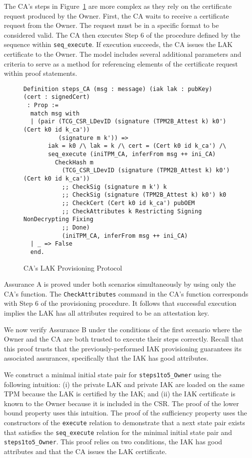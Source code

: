 \documentclass[runningheads]{llncs}
\begin{document}
The CA's steps in Figure~\ref{fig:lak_model_CA} are more complex as
they rely on the certificate request produced by the Owner. 
First, the CA waits to receive a certificate request from the
Owner. The request must be in a specific
format to be considered valid. The CA then executes Step 6 of the
procedure defined by the sequence within \verb|seq_execute|. If
execution succeeds, the CA issues the LAK certificate to the Owner.
The model includes several additional parameters and criteria to serve
as a method for referencing elements of the certificate request
within proof statements.

\begin{figure}[hpbt]
\begin{lstlisting}[language=Coq]
Definition steps_CA (msg : message) (iak lak : pubKey) (cert : signedCert)
 : Prop :=
  match msg with
  | (pair (TCG_CSR_LDevID (signature (TPM2B_Attest k) k0') (Cert k0 id k_ca'))
          (signature m k')) =>
       iak = k0 /\ lak = k /\ cert = (Cert k0 id k_ca') /\
       seq_execute (iniTPM_CA, inferFrom msg ++ ini_CA)
         CheckHash m
           (TCG_CSR_LDevID (signature (TPM2B_Attest k) k0') (Cert k0 id k_ca'))
           ;; CheckSig (signature m k') k
           ;; CheckSig (signature (TPM2B_Attest k) k0') k0
           ;; CheckCert (Cert k0 id k_ca') pubOEM
           ;; CheckAttributes k Restricting Signing NonDecrypting Fixing
           ;; Done)
           (iniTPM_CA, inferFrom msg ++ ini_CA)
  | _ => False
  end.
\end{lstlisting}
\caption{CA's LAK Provisioning Protocol}
\label{fig:lak_model_CA}
\end{figure}

Assurance A is proved under both scenarios simultaneously 
by using only the CA's function. 
The \verb|CheckAttributes| command in the CA's function corresponds with
Step 6 of the provisioning procedure.  It follows that successful
execution implies the LAK has all attributes required to be an
attestation key.

We now verify Assurance B under the conditions of the first scenario
where the Owner and the CA are both trusted to execute their steps
correctly. Recall that this proof trusts that the
previously-performed IAK provisioning guarantees its associated
assurances, specifically that the IAK has good attributes.

We construct a minimal initial state pair for \verb|steps1to5_Owner|
using the following intuition: (i) the private LAK and private IAK are
loaded on the same TPM because the LAK is certified by the IAK; and
(ii) the IAK certificate is known to the Owner because it is included
in the CSR.  The proof of the lower bound property uses this
intuition.  The proof of the sufficiency property uses the
constructors of the \verb|execute| relation to demonstrate that a next
state pair exists that satisfies the \verb|seq_execute| relation for
the minimal initial state pair and \verb|steps1to5_Owner|. This proof
relies on two conditions, the IAK has good attributes and that the CA
issues the LAK certificate.
\end{document}
